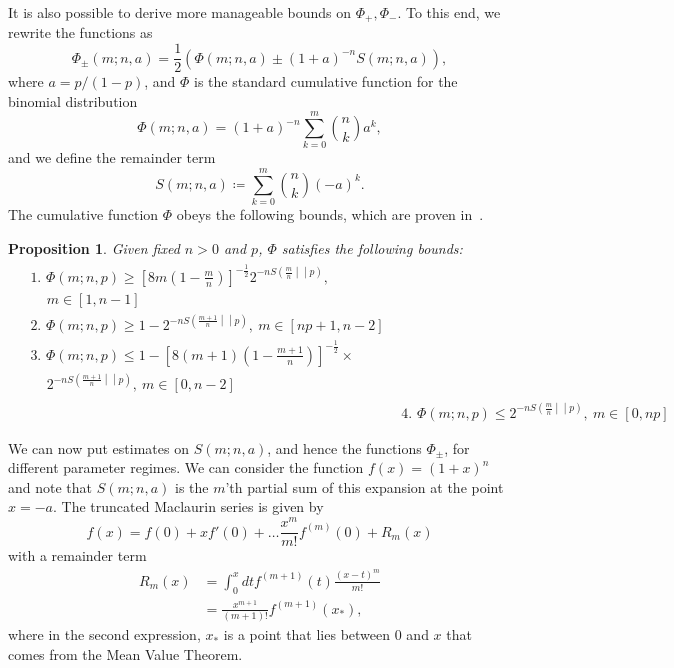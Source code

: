 \documentclass[
twocolumn,
superscriptaddress
]{revtex4-1}
\newtheorem{proposition}[theorem]{Proposition}
\newcommand{\ent}[2]{S\left( #1 \middle\vert\middle\vert #2 \right)}
\begin{document}
It is also possible to derive more manageable bounds on $\Phi_+, \Phi_-$.
To this end, we rewrite the functions as
\begin{equation}
	\Phi_{\pm}(m; n, a) = \frac{1}{2}(\Phi(m; n, a) \pm (1+a)^{-n} S(m; n, a)),
\end{equation}
where $a = p/(1-p)$, and $\Phi$ is the standard cumulative function for the binomial distribution
\begin{equation}
	\Phi(m; n, a) = (1+a)^{-n} \sum_{k=0}^m \binom{n}{k} a^k,
\end{equation}
and we define the remainder term
\begin{equation}
	S(m; n, a) \coloneqq \sum_{k=0}^m \binom{n}{k} (-a)^k.
\end{equation}
The cumulative function $\Phi$ obeys the following bounds, which are proven in~\cite{cit:ash}.
\begin{proposition}\label{phi_bounds}
	Given fixed $n>0$ and $p$, $\Phi$ satisfies the following bounds:
	\begin{align*}
		\begin{split}
		&\text{1. } \Phi(m; n, p) \geq \left[ 8m\left(1-\frac{m}{n}\right) \right]^{-\frac{1}{2}} 2^{-n\ent{\frac{m}{n}}{p}}, \\
		&\hspace{14pt} m\in [1,n-1] \\
		&\text{2. } \Phi(m; n, p) \geq 1 - 2^{-n\ent{\frac{m+1}{n}}{p}},\ m\in [np+1,n-2] \\
		&\text{3. } \Phi(m; n, p) \leq 1 - \left[ 8(m+1)\left(1-\frac{m+1}{n}\right) \right]^{-\frac{1}{2}}\times \\
		&\hspace{14pt} 2^{-n\ent{\frac{m+1}{n}}{p}},\ m\in [0,n-2]
		\end{split}
		\\
		&\text{4. } \Phi(m; n, p) \leq 2^{-n\ent{\frac{m}{n}}{p}},\ m\in [0,np]
	\end{align*}
\end{proposition}

We can now put estimates on $S(m; n, a)$, and hence the functions $\Phi_{\pm}$, for different parameter regimes. 
We can consider the function $f(x) = (1+x)^n$ and note that $S(m; n, a)$ is the $m$'th partial sum of this expansion at the point $x=-a$. The truncated Maclaurin series is given by
\begin{equation}
	f(x) = f(0) + x f'(0) + \dots \frac{x^m}{m!}f^{(m)}(0) + R_m(x)
\end{equation}
with a remainder term
\begin{align}
	R_m (x)&= \int_{0}^x dt f^{(m+1)}(t) \frac{(x-t)^m}{m!} \\
	&= \frac{x^{m+1}}{(m+1)!} f^{(m+1)}(x_*),
\end{align}
where in the second expression, $x_*$ is a point that lies between $0$ and $x$ that comes from the Mean Value Theorem.
\end{document}
